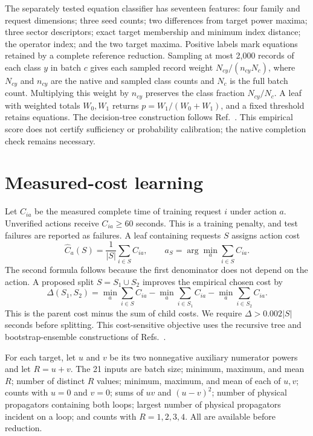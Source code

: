 The separately tested equation classifier has seventeen features: four family and request dimensions; three seed counts; two differences from target power maxima; three sector descriptors; exact target membership and minimum index distance; the operator index; and the two target maxima. Positive labels mark equations retained by a complete reference reduction. Sampling at most 2,000 records of each class $y$ in batch $c$ gives each sampled record weight $N_{cy}/(n_{cy}N_c)$, where $N_{cy}$ and $n_{cy}$ are the native and sampled class counts and $N_c$ is the full batch count. Multiplying this weight by $n_{cy}$ preserves the class fraction $N_{cy}/N_c$. A leaf with weighted totals $W_0,W_1$ returns $p=W_1/(W_0+W_1)$, and a fixed threshold retains equations. The decision-tree construction follows Ref.~\cite{CART1984}. This empirical score does not certify sufficiency or probability calibration; the native completion check remains necessary.

\section{Measured-cost learning}
\label{app:shared}
Let $C_{ia}$ be the measured complete time of training request $i$ under action $a$. Unverified actions receive $C_{ia}\geq60$ seconds. This is a training penalty, and test failures are reported as failures. A leaf containing requests $S$ assigns action cost
\begin{equation}
 \widehat C_a(S)=\frac{1}{|S|}\sum_{i\in S}C_{ia},\qquad
 a_S=\arg\min_a\sum_{i\in S}C_{ia}.
 \label{eq:cost-leaf}
\end{equation}
The second formula follows because the first denominator does not depend on the action. A proposed split $S=S_1\cup S_2$ improves the empirical chosen cost by
\begin{equation}
 \Delta(S_1,S_2)=\min_a\sum_{i\in S}C_{ia}
 -\min_a\sum_{i\in S_1}C_{ia}
 -\min_a\sum_{i\in S_2}C_{ia}.
 \label{eq:cost-split}
\end{equation}
This is the parent cost minus the sum of child costs. We require $\Delta>0.002|S|$ seconds before splitting. This cost-sensitive objective uses the recursive tree and bootstrap-ensemble constructions of Refs.~\cite{CART1984,Breiman2001Forest}.

For each target, let $u$ and $v$ be its two nonnegative auxiliary numerator powers and let $R=u+v$. The 21 inputs are batch size; minimum, maximum, and mean $R$; number of distinct $R$ values; minimum, maximum, and mean of each of $u,v$; counts with $u=0$ and $v=0$; sums of $uv$ and $(u-v)^2$; number of physical propagators containing both loops; largest number of physical propagators incident on a loop; and counts with $R=1,2,3,4$. All are available before reduction.

